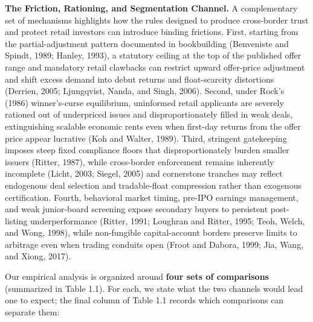 \documentclass[11pt,letterpaper]{article}
\begin{document}
\textbf{The Friction, Rationing, and Segmentation Channel.} A complementary set of mechanisms highlights how the rules designed to produce cross-border trust and protect retail investors can introduce binding frictions. First, starting from the partial-adjustment pattern documented in bookbuilding (Benveniste and Spindt, 1989; Hanley, 1993), a statutory ceiling at the top of the published offer range and mandatory retail clawbacks can restrict upward offer-price adjustment and shift excess demand into debut returns and float-scarcity distortions (Derrien, 2005; Ljungqvist, Nanda, and Singh, 2006). Second, under Rock's (1986) winner's-curse equilibrium, uninformed retail applicants are severely rationed out of underpriced issues and disproportionately filled in weak deals, extinguishing scalable economic rents even when first-day returns from the offer price appear lucrative (Koh and Walter, 1989). Third, stringent gatekeeping imposes steep fixed compliance floors that disproportionately burden smaller issuers (Ritter, 1987), while cross-border enforcement remains inherently incomplete (Licht, 2003; Siegel, 2005) and cornerstone tranches may reflect endogenous deal selection and tradable-float compression rather than exogenous certification. Fourth, behavioral market timing, pre-IPO earnings management, and weak junior-board screening expose secondary buyers to persistent post-listing underperformance (Ritter, 1991; Loughran and Ritter, 1995; Teoh, Welch, and Wong, 1998), while non-fungible capital-account borders preserve limits to arbitrage even when trading conduits open (Froot and Dabora, 1999; Jia, Wang, and Xiong, 2017).

Our empirical analysis is organized around \textbf{four sets of comparisons} (summarized in Table 1.1). For each, we state what the two channels would lead one to expect; the final column of Table 1.1 records which comparisons can separate them:
\end{document}
